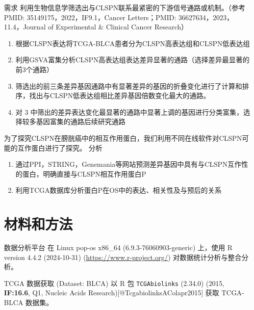 \documentclass[
  ignorenonframetext,
]{beamer}
\providecommand{\tightlist}{%
  \setlength{\itemsep}{0pt}\setlength{\parskip}{0pt}}
\begin{document}
\begin{frame}{需求}
\protect\hypertarget{ux9700ux6c42}{}
利用生物信息学筛选出与CLSPN联系最紧密的下游信号通路或机制。（参考PMID:
35149175，2022，IF9.1，Cancer Letters；PMID:
36627634，2023，11.4，Journal of Experimental \& Clinical Cancer
Research）

\begin{enumerate}
\tightlist
\item
  根据CLSPN表达将TCGA-BLCA患者分为CLSPN高表达组和CLSPN低表达组
\item
  利用GSVA富集分析CLSPN高表达组表达差异显著的通路（选择差异最显著的前3个通路）
\item
  筛选出的前三条差异基因通路中有显著差异的基因的折叠变化进行了计算和排序，找出与CLSPN低表达组相比差异基因倍数变化最大的通路。
\item
  对 3
  中筛出的差异表达变化最显著的通路中显著上调的基因进行分类富集，选择较多基因富集的通路后续研究通路
\end{enumerate}

为了探究CLSPN在膀胱癌中的相互作用蛋白，我们利用不同在线软件对CLSPN可能的互作蛋白进行了探究。
分析

\begin{enumerate}
\tightlist
\item
  通过PPI，STRING，Genemania等网站预测差异基因中具有与CLSPN互作性的蛋白，明确直接与CLSPN相互作用蛋白P
\item
  利用TCGA数据库分析蛋白P在OS中的表达、相关性及与预后的关系
\end{enumerate}
\end{frame}

\hypertarget{introduction}{%
\section{材料和方法}\label{introduction}}

\begin{frame}{数据分析平台}
\protect\hypertarget{ux6570ux636eux5206ux6790ux5e73ux53f0}{}
在 Linux pop-os x86\_64 (6.9.3-76060903-generic) 上，使用 R version
4.4.2 (2024-10-31) (\url{https://www.r-project.org/})
对数据统计分析与整合分析。
\end{frame}

\begin{frame}[fragile]{TCGA 数据获取 (Dataset: BLCA)}
\protect\hypertarget{tcga-ux6570ux636eux83b7ux53d6-dataset-blca}{}
以 R 包 \texttt{TCGAbiolinks} (2.34.0) (2015, \textbf{IF:16.6}, Q1,
Nucleic Acids Research){[}@TcgabiolinksAColapr2015{]} 获取 TCGA-BLCA
数据集。
\end{frame}
\end{document}

